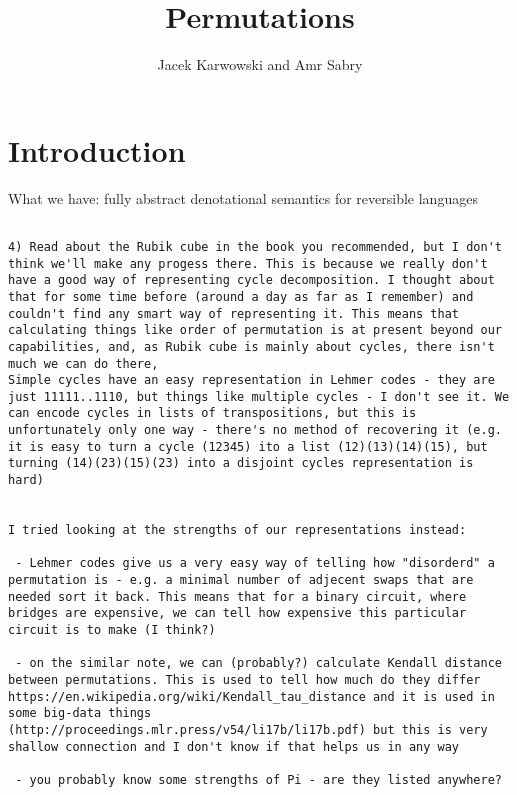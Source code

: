 \documentclass{article}
\title{Permutations}
\author{Jacek Karwowski and Amr Sabry}
\begin{document}
\maketitle

\section{Introduction}



What we have: fully abstract denotational semantics for reversible languages

\begin{verbatim}

4) Read about the Rubik cube in the book you recommended, but I don't think we'll make any progess there. This is because we really don't have a good way of representing cycle decomposition. I thought about that for some time before (around a day as far as I remember) and couldn't find any smart way of representing it. This means that calculating things like order of permutation is at present beyond our capabilities, and, as Rubik cube is mainly about cycles, there isn't much we can do there,
Simple cycles have an easy representation in Lehmer codes - they are just 11111..1110, but things like multiple cycles - I don't see it. We can encode cycles in lists of transpositions, but this is unfortunately only one way - there's no method of recovering it (e.g. it is easy to turn a cycle (12345) ito a list (12)(13)(14)(15), but turning (14)(23)(15)(23) into a disjoint cycles representation is hard)


I tried looking at the strengths of our representations instead:

 - Lehmer codes give us a very easy way of telling how "disorderd" a permutation is - e.g. a minimal number of adjecent swaps that are needed sort it back. This means that for a binary circuit, where bridges are expensive, we can tell how expensive this particular circuit is to make (I think?) 

 - on the similar note, we can (probably?) calculate Kendall distance between permutations. This is used to tell how much do they differ https://en.wikipedia.org/wiki/Kendall_tau_distance and it is used in some big-data things (http://proceedings.mlr.press/v54/li17b/li17b.pdf) but this is very shallow connection and I don't know if that helps us in any way

 - you probably know some strengths of Pi - are they listed anywhere?


\end{verbatim}
\end{document}
